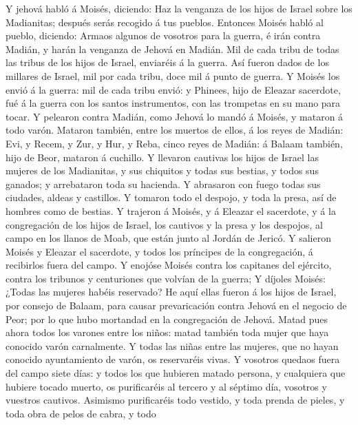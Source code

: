  Y jehová habló á Moisés, diciendo:  Haz la
venganza de los hijos de Israel sobre los Madianitas; después serás
recogido á tus pueblos.  Entonces Moisés habló al pueblo,
diciendo: Armaos algunos de vosotros para la guerra, é irán contra
Madián, y harán la venganza de Jehová en Madián.  Mil de
cada tribu de todas las tribus de los hijos de Israel, enviaréis á la
guerra.  Así fueron dados de los millares de Israel, mil por
cada tribu, doce mil á punto de guerra.  Y Moisés los envió
á la guerra: mil de cada tribu envió: y Phinees, hijo de Eleazar
sacerdote, fué á la guerra con los santos instrumentos, con las
trompetas en su mano para tocar.  Y pelearon contra Madián,
como Jehová lo mandó á Moisés, y mataron á todo varón. 
Mataron también, entre los muertos de ellos, á los reyes de Madián: Evi,
y Recem, y Zur, y Hur, y Reba, cinco reyes de Madián: á Balaam también,
hijo de Beor, mataron á cuchillo.  Y llevaron cautivas los
hijos de Israel las mujeres de los Madianitas, y sus chiquitos y todas
sus bestias, y todos sus ganados; y arrebataron toda su hacienda.
 Y abrasaron con fuego todas sus ciudades, aldeas y
castillos.  Y tomaron todo el despojo, y toda la presa, así
de hombres como de bestias.  Y trajeron á Moisés, y á
Eleazar el sacerdote, y á la congregación de los hijos de Israel, los
cautivos y la presa y los despojos, al campo en los llanos de Moab, que
están junto al Jordán de Jericó.  Y salieron Moisés y
Eleazar el sacerdote, y todos los príncipes de la congregación, á
recibirlos fuera del campo.  Y enojóse Moisés contra los
capitanes del ejército, contra los tribunos y centuriones que volvían de
la guerra;  Y díjoles Moisés: ¿Todas las mujeres habéis
reservado?  He aquí ellas fueron á los hijos de Israel, por
consejo de Balaam, para causar prevaricación contra Jehová en el negocio
de Peor; por lo que hubo mortandad en la congregación de Jehová.
 Matad pues ahora todos los varones entre los niños: matad
también toda mujer que haya conocido varón carnalmente.  Y
todas las niñas entre las mujeres, que no hayan conocido ayuntamiento de
varón, os reservaréis vivas.  Y vosotros quedaos fuera del
campo siete días: y todos los que hubieren matado persona, y cualquiera
que hubiere tocado muerto, os purificaréis al tercero y al séptimo día,
vosotros y vuestros cautivos.  Asimismo purificaréis todo
vestido, y toda prenda de pieles, y toda obra de pelos de cabra, y todo

